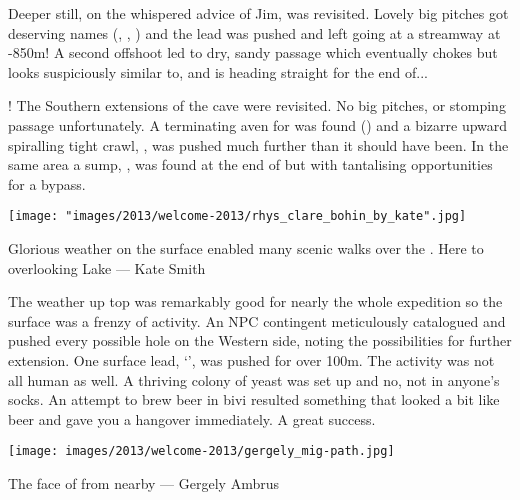 Deeper still, on the whispered advice of Jim,  was revisited. Lovely big pitches got deserving names (, , ) and the lead was pushed and left going at a streamway at -850m! A second offshoot led to dry, sandy passage which eventually chokes but looks suspiciously similar to, and is heading straight for the end of...

! The Southern extensions of the cave were revisited. No big pitches, or stomping passage unfortunately. A terminating aven for  was found () and a bizarre upward spiralling tight crawl, , was pushed much further than it should have been. In the same area a sump, , was found at the end of  but with tantalising opportunities for a bypass.

\begin{marginfigure}
\texttt{[image: "images/2013/welcome-2013/rhys\_clare\_bohin\_by\_kate".jpg]}
\caption{Glorious weather on the surface enabled many scenic walks over the \protect{}. Here to \protect{} overlooking Lake \protect{} --- Kate Smith}
\label{rhys_clare_bohin}
\end{marginfigure}

The weather up top was remarkably good for nearly the whole expedition so the surface was a frenzy of activity. An NPC contingent meticulously catalogued and pushed every possible hole on the Western side, noting the possibilities for further extension. One surface lead, `', was pushed for over 100m. The activity was not all human as well. A thriving colony of yeast was set up and no, not in anyone's socks. An attempt to brew beer in bivi resulted something that looked a bit like beer and gave you a hangover immediately. A great success.


\begin{pagefigure}
\texttt{[image: images/2013/welcome-2013/gergely\_mig-path.jpg]} \caption{The face of \protect{} from nearby \protect{}--- Gergely Ambrus}
\end{pagefigure}
